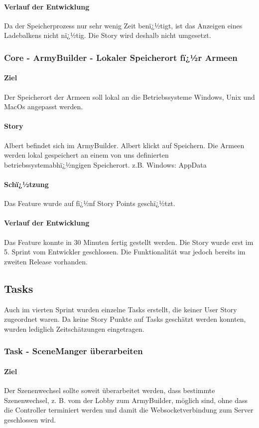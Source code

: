 \documentclass[12pt, titlepage]{scrartcl}
\begin{document}
			\paragraph{Verlauf der Entwicklung} 
			Da der Speicherprozess nur sehr wenig Zeit benï¿½tigt, ist das Anzeigen eines Ladebalkens nicht nï¿½tig. Die Story wird deshalb nicht umgesetzt.
			\subsubsection{Core - ArmyBuilder - Lokaler Speicherort fï¿½r Armeen}
			\paragraph{Ziel} Der Speicherort der Armeen soll lokal an die Betriebssysteme Windows, Unix und MacOs angepasst werden. 
			\paragraph{Story} Albert befindet sich im ArmyBuilder. Albert klickt auf Speichern. Die Armeen werden lokal gespeichert an einem von uns definierten betriebssystemabhï¿½ngigen Speicherort.
			z.B. Windows: AppData 
			\paragraph{Schï¿½tzung}
			Das Feature wurde auf fï¿½nf Story Points geschï¿½tzt.
			\paragraph{Verlauf der Entwicklung} 
			Das Feature konnte in 30 Minuten fertig gestellt werden. Die Story wurde erst im 5. Sprint vom Entwickler geschlossen. Die Funktionalität war jedoch bereits im zweiten Release vorhanden.
			\subsection{Tasks}
			Auch im vierten Sprint wurden einzelne Tasks erstellt, die keiner User Story zugeordnet waren. Da keine Story Punkte auf Tasks geschätzt werden konnten, wurden lediglich Zeitschätzungen eingetragen.
			\subsubsection{Task - SceneManger überarbeiten}
			\paragraph{Ziel} Der Szenenwechsel sollte soweit überarbeitet werden, dass bestimmte Szenenwechsel, z. B. vom der Lobby zum ArmyBuilder, möglich sind, ohne dass die Controller terminiert werden und damit die Websocketverbindung zum Server geschlossen wird.
\end{document}
